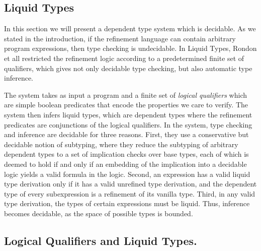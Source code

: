 %

\subsection{Liquid Types}\label{subsec:liquid}

In this section we will present a dependent type system which is decidable.
As we stated in the introduction, if the refinement language can contain arbitrary 
program expressions, then type checking is undecidable.
%
In Liquid Types\cite{LiquidPLDI08},  Rondon et all restricted the refinement logic according to a predetermined 
finite set of qualifiers,  which gives not only decidable type checking, but also automatic
type inference.



The system takes as input a program and 
a finite set of \textit{logical qualifiers}
which are simple boolean predicates 
that encode the properties we care to verify. 
The system then infers
liquid types, which are dependent types where the refinement predicates are conjunctions of the logical qualifiers.
In the system, type checking and inference are decidable for
three reasons. 
%
First, they use a conservative but decidable
notion of subtyping, where they reduce the subtyping of arbitrary
dependent types to a set of implication checks over base types,
each of which is deemed to hold if and only if an embedding of
the implication into a decidable logic yields a valid formula in
the logic. 
%
Second, an expression has a valid liquid type derivation
only if it has a valid unrefined type derivation, and the dependent 
type of every subexpression is a refinement of its vanilla type. 
%
Third, in any valid type derivation, the types of certain expressions
must be liquid. Thus, inference becomes decidable, as the space of
possible types is bounded. 


\subsection{Logical Qualifiers and Liquid Types.}

